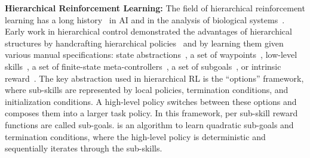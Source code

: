 \vspace{0.25em}\noindent\textbf{Hierarchical Reinforcement Learning: } 
The field of hierarchical reinforcement learning has a long history~\citep{parr98,suttonPS99,barto03} in AI and in the analysis of biological systems~\citep{botvinick08,botvinick2009hierarchically,solway2014optimal,zacksKEH11,whitenFBL06}.
Early work in hierarchical control demonstrated the advantages of hierarchical structures by handcrafting hierarchical policies~\citep{brooks1986robust} and by learning them given various manual specifications: state abstractions~\citep{dayanH92,hengst02,kolterAN07,konidarisB07}, a set of waypoints~\citep{kaelbling93}, low-level skills~\citep{huberG97,baconP15,liaw17composing}, a set of finite-state meta-controllers~\citep{parrR97}, a set of subgoals~\citep{suttonPS99,dietterich00}, or intrinsic reward~\citep{kulkarni2016hierarchical}.
The key abstraction used in hierarchical RL is the ``options'' framework, where sub-skills are represented by local policies, termination conditions, and initialization conditions.
A high-level policy switches between these options and composes them into  a larger task policy.
In this framework, per sub-skill reward functions are called sub-goals. \hirl is an algorithm to learn quadratic sub-goals and termination conditions, where the high-level policy is deterministic and sequentially iterates through the sub-skills. 


